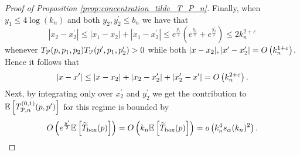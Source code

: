 \begin{proof}[Proof of Proposition \ref{prop:concentration_tilde_T_P_n}]
Finally, when $y_1 \le 4\log(k_n)$ and both $y_2, y_2^\prime \le b_n$ we have that
\[
	|x_2 - x_2^\prime| \le |x_1 - x_2| + |x_1 - x_2^\prime| \le e^{\frac{y_1}{2}}\left(e^{\frac{y_2}{2}} + e^{\frac{y_2^\prime}{2}}\right) \le 2k_n^{2+\varepsilon}
\]
whenever $T_{{\mathcal P}}(p,p_1,p_2) T_{{\mathcal P}}(p^\prime,p_1,p_2^\prime) > 0$ while both $|x - x_2|, |x^\prime - x_2^\prime| = O\left(k_n^{1 + \varepsilon}\right)$. Hence it follows that
\[
	|x - x^\prime| \le |x - x_2| + |x_2 - x_2^\prime| + |x_2^\prime - x^\prime| = O\left(k_n^{2 + \varepsilon}\right).
\]
Next, by integrating only over $x_2^\prime$ and $y_2^\prime $ we get the contribution to $\mathbb{E}\left[T^{(0,1)}_{{\mathcal P},n}(p,p^\prime)\right]$ for this regime is bounded by
\[
	O\left(e^{\frac{y^\prime}{2}} \mathbb{E}\left[\widetilde{T}_{\text{box}}(p)\right]\right)
	= O\left(k_n \mathbb{E}\left[\widetilde{T}_{\text{box}}(p)\right]\right) = o\left(k_n^4 s_\alpha(k_n)^2\right).
\]



%

\end{proof}

%
%
